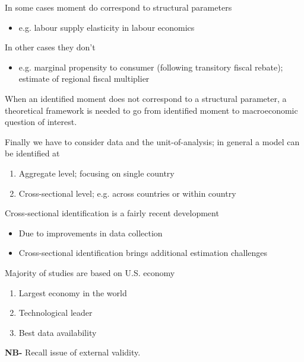\documentclass{beamer}
\begin{document}
\begin{frame}
  In some cases moment do correspond to structural parameters
  \begin{itemize}
    \item e.g. labour supply elasticity in labour economics
  \end{itemize}
  \medskip
  In other cases they don't
  \begin{itemize}
    \item e.g. marginal propensity to consumer (following transitory fiscal rebate); estimate of regional fiscal multiplier
  \end{itemize}
  \medskip
  When an identified moment does not correspond to a structural parameter, a theoretical framework is needed to go from identified moment to macroeconomic question of interest.
\end{frame}

\begin{frame}
 Finally we have to consider data and the unit-of-analysis; in general a model can be identified at 
 \medskip 
  \begin{enumerate}
    \item Aggregate level; focusing on single country
    \item Cross-sectional level; e.g. across countries or within country
  \end{enumerate}
  \medskip
  Cross-sectional identification is a fairly recent development
  \begin{itemize}
    \item Due to improvements in data collection
    \item Cross-sectional identification brings additional estimation challenges
  \end{itemize}
\end{frame}

\begin{frame}
 Majority of studies are based on U.S. economy
 \medskip
 \begin{enumerate}
   \item Largest economy in the world
   \item Technological leader
   \item Best data availability
 \end{enumerate}
 \medskip
 \textbf{NB-} Recall issue of external validity.
\end{frame}
\end{document}

